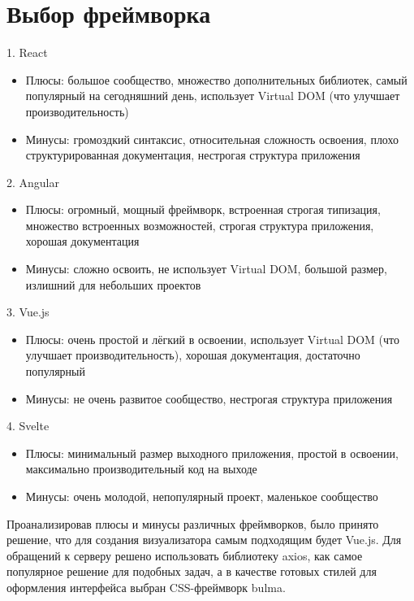 \section{Выбор фреймворка} \label{ch4:sec5}
1.	React
\begin{itemize}
\item Плюсы: большое сообщество, множество дополнительных библиотек, самый популярный на сегодняшний день, использует Virtual DOM (что улучшает производительность)
\item Минусы: громоздкий синтаксис, относительная сложность освоения, плохо структурированная документация, нестрогая структура приложения
\end{itemize}
2.	Angular
\begin{itemize}
\item Плюсы: огромный, мощный фреймворк, встроенная строгая типизация, множество встроенных возможностей, строгая структура приложения, хорошая документация
\item Минусы: сложно освоить, не использует Virtual DOM, большой размер, излишний для небольших проектов
\end{itemize}
3.	Vue.js
\begin{itemize}
\item Плюсы: очень простой и лёгкий в освоении, использует Virtual DOM (что улучшает производительность), хорошая документация, достаточно популярный
\item Минусы: не очень развитое сообщество, нестрогая структура приложения
\end{itemize}
4.	Svelte
\begin{itemize}
\item Плюсы: минимальный размер выходного приложения, простой в освоении, максимально производительный код на выходе
\item Минусы: очень молодой, непопулярный проект, маленькое сообщество
\end{itemize}
Проанализировав плюсы и минусы различных фреймворков, было принято решение, что для создания визуализатора самым подходящим будет Vue.js. Для обращений к серверу решено использовать библиотеку axios, как самое популярное решение для подобных задач, а в качестве готовых стилей для оформления интерфейса выбран CSS-фреймворк bulma.
